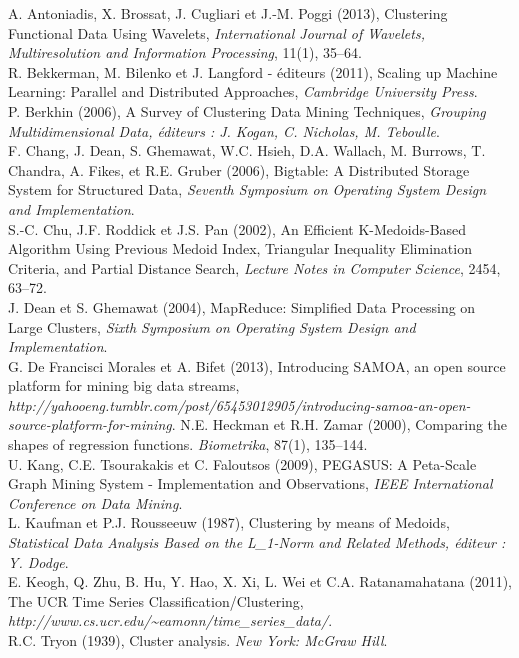 \documentclass[12pt]{article}
\begin{document}
\noindent [1] A. Antoniadis, X. Brossat, J. Cugliari et J.-M. Poggi (2013), Clustering Functional Data Using Wavelets, {\it International Journal of Wavelets, Multiresolution and Information Processing}, 11(1), 35--64.\\%
\noindent [2] R. Bekkerman, M. Bilenko et J. Langford - éditeurs (2011), Scaling up Machine Learning: Parallel and Distributed Approaches, {\it Cambridge University Press}.\\
\noindent [3] P. Berkhin (2006), A Survey of Clustering Data Mining Techniques, {\it Grouping Multidimensional Data, éditeurs : J. Kogan, C. Nicholas, M. Teboulle}.\\
\noindent [4] F. Chang, J. Dean, S. Ghemawat, W.C. Hsieh, D.A. Wallach, M. Burrows, T. Chandra, A. Fikes, et R.E. Gruber (2006), Bigtable: A Distributed Storage System for Structured Data, {\it Seventh Symposium on Operating System Design and Implementation}.\\
\noindent [5] S.-C. Chu, J.F. Roddick et J.S. Pan (2002), An Efficient K-Medoids-Based Algorithm Using Previous Medoid Index, Triangular Inequality Elimination Criteria, and Partial Distance Search, {\it Lecture Notes in Computer Science}, 2454, 63--72.\\
\noindent [6] J. Dean et S. Ghemawat (2004), MapReduce: Simplified Data Processing on Large Clusters, {\it Sixth Symposium on Operating System Design and Implementation}.\\
\noindent [7] G. De Francisci Morales et A. Bifet (2013), Introducing SAMOA, an open source platform for mining big data streams, {\it http://yahooeng.tumblr.com/post/65453012905/introducing-samoa-an-open-source-platform-for-mining}.
\noindent [8] N.E. Heckman et R.H. Zamar (2000), Comparing the shapes of regression functions. {\it Biometrika}, 87(1), 135--144.\\
\noindent [9] U. Kang, C.E. Tsourakakis et C. Faloutsos (2009), PEGASUS: A Peta-Scale Graph Mining System - Implementation and Observations, {\it IEEE International Conference on Data Mining}.\\
\noindent [10] L. Kaufman et P.J. Rousseeuw (1987), Clustering by means of Medoids, {\it Statistical Data Analysis Based on the L\_1-Norm and Related Methods, éditeur : Y. Dodge}.\\
\noindent [11] E. Keogh, Q. Zhu, B. Hu, Y. Hao, X. Xi, L. Wei et C.A. Ratanamahatana (2011), The UCR Time Series Classification/Clustering, {\it http://www.cs.ucr.edu/\~{}eamonn/time\_series\_data/}.\\
\noindent [12] R.C. Tryon (1939), Cluster analysis. {\it New York: McGraw Hill}.\\

\end{document}
